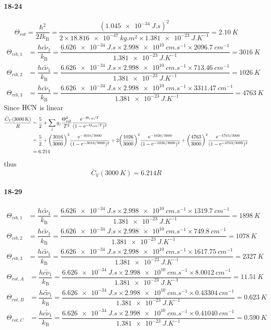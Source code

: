 \documentclass[a4paper]{article}
\DeclareMathOperator{\e}{\mathrm{e}}
\newcommand{\kB}{k_\mathrm{B}}
\newcommand{\ex}[1]{\paragraph{18-#1}}
\numberwithin{equation}{section}
\begin{document}
\ex{24}
\begin{equation}\label{key}
\Theta_{rot} = \dfrac{\hbar^2}{2I \kB} = \dfrac{(\SI{1.045e-34}{J.s})^2}{2\times \SI{18.816e-47}{kg.m^2}\times\SI{1.381e-23}{J.K^{-1}}} = \SI{2.10}{K}
\end{equation}
\begin{align}
\Theta_{vib,1} &= \dfrac{hc\tilde{\nu}_1}{\kB} = \dfrac{\SI{6.626e-34}{J.s}\times\SI{2.998e10}{cm.s^{-1}} \times\SI{2096.7}{cm^{-1}}}{\SI{1.381e-23}{J.K^{-1}}} = \SI{3016}{K} \\
\Theta_{vib,2} &= \dfrac{hc\tilde{\nu}_1}{\kB} = \dfrac{\SI{6.626e-34}{J.s}\times\SI{2.998e10}{cm.s^{-1}} \times\SI{713.46}{cm^{-1}}}{\SI{1.381e-23}{J.K^{-1}}} = \SI{1026}{K} \\
\Theta_{vib,3} &= \dfrac{hc\tilde{\nu}_1}{\kB} = \dfrac{\SI{6.626e-34}{J.s}\times\SI{2.998e10}{cm.s^{-1}} \times\SI{3311.47}{cm^{-1}}}{\SI{1.381e-23}{J.K^{-1}}} = \SI{4763}{K} 
\end{align}
Since $ \ce{HCN} $ is linear
\begin{align}
\dfrac{\bar{C}_V(\SI{3000}{K})}{R} &= \dfrac{5}{2} + \sum_j g_j\dfrac{\Theta_{vib}^2}{T^2}\dfrac{\e^{-\Theta_{vib} /T}}{(1 - \e^{-\Theta_{vib} /T})^2} \notag\\
&= \dfrac{5}{2} + \qty(\dfrac{3016}{3000})^2\dfrac{\e^{-3016/3000}}{(1-\e^{-3016/3000})^2} + 2\qty(\dfrac{1026}{3000})^2\dfrac{\e^{-1026/3000}}{(1-\e^{-1026/3000})^2} + \qty(\dfrac{4763}{3000})^2\dfrac{\e^{-4763/3000}}{(1-\e^{-4763/3000})^2} \notag\\
&= 6.214
\end{align}
thus
\begin{equation}\label{key}
\bar{C}_V(\SI{3000}{K}) = 6.214R
\end{equation}

\ex{29}
\begin{align}
\Theta_{vib,1} &= \dfrac{hc\tilde{\nu}_1}{\kB} = \dfrac{\SI{6.626e-34}{J.s}\times\SI{2.998e10}{cm.s^{-1}} \times\SI{1319.7}{cm^{-1}}}{\SI{1.381e-23}{J.K^{-1}}} = \SI{1898}{K} \\
\Theta_{vib,2} &= \dfrac{hc\tilde{\nu}_1}{\kB} = \dfrac{\SI{6.626e-34}{J.s}\times\SI{2.998e10}{cm.s^{-1}} \times\SI{749.8}{cm^{-1}}}{\SI{1.381e-23}{J.K^{-1}}} = \SI{1078}{K} \\
\Theta_{vib,3} &= \dfrac{hc\tilde{\nu}_1}{\kB} = \dfrac{\SI{6.626e-34}{J.s}\times\SI{2.998e10}{cm.s^{-1}} \times\SI{1617.75}{cm^{-1}}}{\SI{1.381e-23}{J.K^{-1}}} = \SI{2327}{K} 
\end{align}
\begin{align}
\Theta_{rot,A} &= \dfrac{hc\tilde{\nu}_1}{\kB} = \dfrac{\SI{6.626e-34}{J.s}\times\SI{2.998e10}{cm.s^{-1}} \times\SI{8.0012}{cm^{-1}}}{\SI{1.381e-23}{J.K^{-1}}} = \SI{11.51}{K} \\
\Theta_{rot,B} &= \dfrac{hc\tilde{\nu}_1}{\kB} = \dfrac{\SI{6.626e-34}{J.s}\times\SI{2.998e10}{cm.s^{-1}} \times\SI{0.43304}{cm^{-1}}}{\SI{1.381e-23}{J.K^{-1}}} = \SI{0.623}{K} \\
\Theta_{rot,C} &= \dfrac{hc\tilde{\nu}_1}{\kB} = \dfrac{\SI{6.626e-34}{J.s}\times\SI{2.998e10}{cm.s^{-1}} \times\SI{0.41040}{cm^{-1}}}{\SI{1.381e-23}{J.K^{-1}}} = \SI{0.590}{K} 
\end{align}
\end{document}
